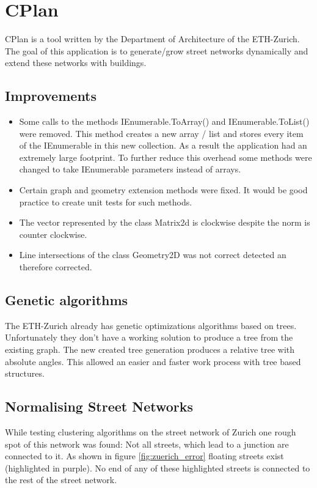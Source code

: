 \chapter{CPlan}\label{CPlan}
CPlan is a tool written by the Department of Architecture of the ETH-Zurich. The goal of this application is to generate/grow street networks dynamically and extend these networks with buildings. 
\section{Improvements}
\begin{itemize}
    \item Some calls to the methods IEnumerable.ToArray() and IEnumerable.ToList() were removed. This method creates a new array / list and stores every item of the IEnumerable in this new collection. As a result the application had an extremely large footprint. To further reduce this overhead some methods were changed to take IEnumerable parameters instead of arrays.
    \item Certain graph and geometry extension methods were fixed. It would be good practice to create unit tests for such methods.
    \item The vector represented by the class Matrix2d is clockwise despite the norm is counter clockwise.
    \item Line intersections of the class Geometry2D was not correct detected an therefore corrected. 
\end{itemize}

\section{Genetic algorithms}
The ETH-Zurich already has genetic optimizations algorithms based on trees. Unfortunately they don't have a working solution to produce a tree from the existing graph. The new created tree generation produces a relative tree with absolute angles. This allowed an easier and faster work process with tree based structures.

\pagebreak
\section{Normalising Street Networks}
While testing clustering algorithms on the street network of Zurich one rough spot of this network was found: Not all streets, which lead to a junction are connected to it. As shown in figure \ref{fig:zuerich_error} floating streets exist (highlighted in purple). No end of any of these highlighted streets is connected to the rest of the street network.

